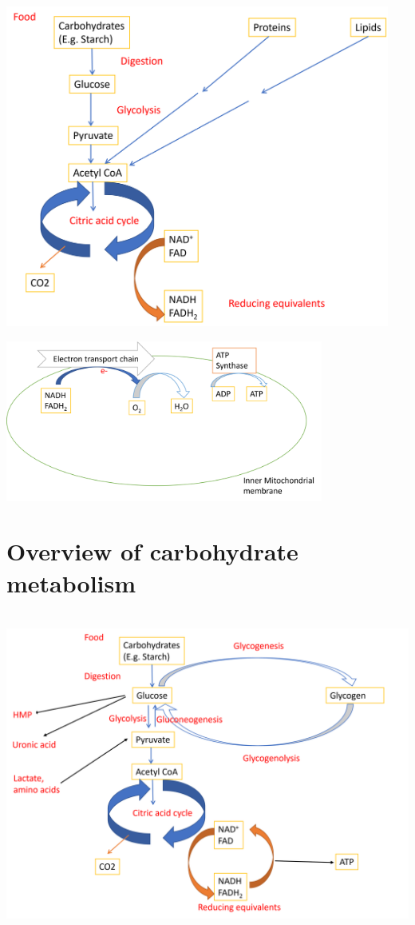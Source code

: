 \documentclass[
]{book}
\begin{document}
\includegraphics[width=\textwidth,height=4.16667in]{Images/NADH.png}

\includegraphics[width=\textwidth,height=2.08333in]{Images/ETC.png}

\section{Overview of carbohydrate metabolism}\label{overview-of-carbohydrate-metabolism}

\includegraphics[width=\textwidth,height=4.16667in]{Images/CarbMet.png}
\end{document}
